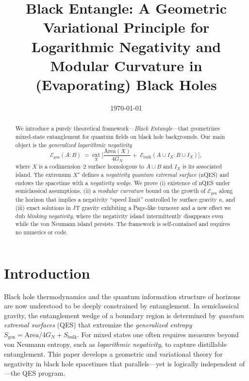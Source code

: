 \documentclass[11pt]{article}
\title{\bf Black Entangle: A Geometric Variational Principle for\\
Logarithmic Negativity and Modular Curvature in (Evaporating) Black Holes}
\author{}
\date{\today}
\newcommand{\Area}{\mathrm{Area}}
\newcommand{\E}{\mathcal{E}}
\begin{document}
\maketitle

\begin{abstract}
We introduce a purely theoretical framework---\emph{Black Entangle}---that geometrizes mixed-state entanglement for quantum fields on black hole backgrounds. Our main object is the \emph{generalized logarithmic negativity}
\begin{equation}
  \E_{\mathrm{gen}}(A:B) \;=\; \underset{X}{\mathrm{ext}}\;\bigg[\frac{\Area(X)}{4G_N}+\;\E_{\mathrm{bulk}}(A\cup I_X: B\cup I_X)\bigg],
  \label{eq:Egen-def}
\end{equation}
where $X$ is a codimension--2 surface homologous to $A\cup B$ and $I_X$ is its associated island. The extremum $X^\star$ defines a \emph{negativity quantum extremal surface} (nQES) and endows the spacetime with a \emph{negativity wedge}. We prove (i) existence of nQES under semiclassical assumptions, (ii) a \emph{modular curvature} bound on the growth of $\E_{\mathrm{gen}}$ along the horizon that implies a negativity ``speed limit'' controlled by surface gravity $\kappa$, and (iii) exact solutions in JT gravity exhibiting a Page-like turnover and a new effect we dub \emph{blinking negativity}, where the negativity island intermittently disappears even while the von Neumann island persists. The framework is self-contained and requires no numerics or code.
\end{abstract}

\tableofcontents

\section{Introduction}
Black hole thermodynamics and the quantum information structure of horizons are now understood to be deeply constrained by entanglement. In semiclassical gravity, the entanglement wedge of a boundary region is determined by \emph{quantum extremal surfaces} (QES) that extremize the \emph{generalized entropy} $S_{\mathrm{gen}}=\Area/4G_N+S_{\mathrm{bulk}}$.
For mixed states one often requires measures beyond von Neumann entropy, such as \emph{logarithmic negativity}, to capture distillable entanglement. This paper develops a geometric and variational theory for negativity in black hole spacetimes that parallels---yet is logically independent of---the QES program.
\end{document}
